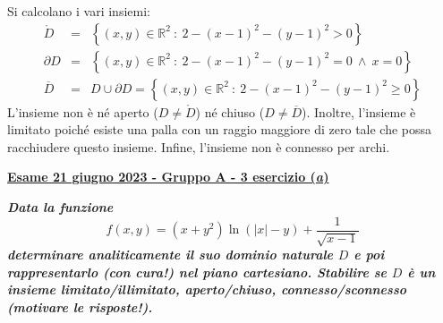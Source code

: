 \documentclass[a4paper]{article}
\newcommand{\definition}[1]{\textcolor{Red3}{\textbf{#1}}}
\newcommand{\example}[1]{\textcolor{Green4}{\textbf{#1}}}
\begin{document}
	\noindent
	Si calcolano i vari insiemi:
	\begin{equation*}
		\begin{array}{rcl}
			\mathring{D} &=& \left\{\left(x,y\right) \in \mathbb{R}^{2} \: : \: 2-\left(x-1\right)^{2}-\left(y-1\right)^{2} > 0\right\} \\
			\partial D &=& \left\{\left(x,y\right) \in \mathbb{R}^{2} \: : \: 2-\left(x-1\right)^{2}-\left(y-1\right)^{2} = 0 \: \land \: x = 0\right\} \\
			\overline{D} &=& D \cup \partial D = \left\{\left(x,y\right) \in \mathbb{R}^{2} \: : \: 2-\left(x-1\right)^{2}-\left(y-1\right)^{2} \ge 0\right\}
		\end{array}
	\end{equation*}
	L'insieme non è né aperto ($D \ne \mathring{D}$) né chiuso ($D \ne \overline{D}$). Inoltre, l'insieme è limitato poiché esiste una palla con un raggio maggiore di zero tale che possa racchiudere questo insieme. Infine, l'insieme non è connesso per archi.\newpage

	\begin{flushleft}
		\label{exam: esame 21 giugno 2023 - Gruppo A - 3 esercizio (a)}
		\hypertarget{
			exam: esame 21 giugno 2023 - Gruppo A - 3 esercizio (a)
		}{
			\definition{\underline{Esame 21 giugno 2023 - Gruppo A - 3 esercizio (\emph{a})}}
		}
	\end{flushleft}
	\example{\emph{Data la funzione}
	\begin{equation*}
		f\left(x,y\right) = \left(x+y^{2}\right)\ln\left(\left|x\right|-y\right) + \dfrac{1}{\sqrt{x-1}}
	\end{equation*}
	\emph{determinare analiticamente il suo dominio naturale $D$ e poi rappresentarlo (con cura!) nel piano cartesiano. Stabilire se $D$ è un insieme limitato/illimitato, aperto/chiuso, connesso/sconnesso (motivare le risposte!).}}\newline
\end{document}
